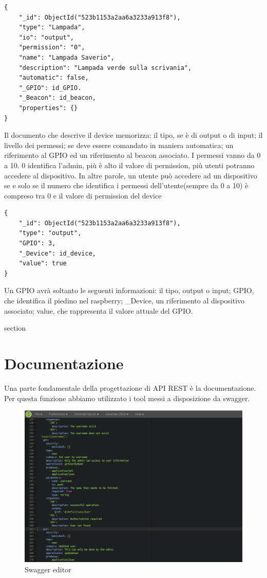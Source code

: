 \begin{lstlisting}[caption={Device collection}, style=javaScriptCode]
{
    "_id": ObjectId("523b1153a2aa6a3233a913f8"),
    "type": "Lampada",
    "io": "output",
    "permission": "0",
    "name": "Lampada Saverio",
    "description": "Lampada verde sulla scrivania",
    "automatic": false,
    "_GPIO": id_GPIO.
    "_Beacon": id_beacon,
    "properties": {}
}
\end{lstlisting}

Il documento che descrive il device memorizza: il tipo, se è di output o di input; il livello dei permessi; se deve essere comandato in maniera automatica; un riferimento al GPIO ed un riferimento al beacon associato. 
I permessi vanno da 0 a 10.
0 identifica l'admin, più è alto il valore di permission, più utenti potranno accedere al dispositivo.
In altre parole, un utente può accedere ad un dispositivo se e solo se il numero che identifica i permessi dell'utente(sempre da 0 a 10) è compreso tra 0 e il valore di permission del device  

\begin{lstlisting}[caption={GPIO collection}, style=javaScriptCode]
{
    "_id": ObjectId("523b1153a2aa6a3233a913f8"),
    "type": "output",
    "GPIO": 3,
    "_Device": id_device,
    "value": true
}
\end{lstlisting}

Un GPIO avrà soltanto le seguenti informazioni: il tipo, output o input; GPIO, che identifica il piedino nel raspberry; \_Device, un riferimento al dispositivo associato; value, che rappresenta il valore attuale del GPIO.

section

\section{Documentazione}
Una parte fondamentale della progettazione di API REST è la documentazione.
Per questa funzione abbiamo utilizzato i tool messi a disposizione da swagger\cite{swagger}.
\begin{figure}[htbp]
\centering
\includegraphics[scale=0.45]{Immagini/swagger-editor.png}
\caption{Swagger editor} 
\end{figure}\\

